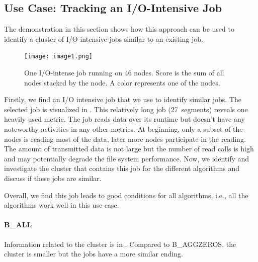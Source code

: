 \documentclass{jhps}
\makeatletter
\newcommand{\jk}[1]{\todo[inline]{JK:\@#1}}
\newcommand{\eb}[1]{\todo[inline, color=GreenYellow]{EB:\@#1}}
\makeatother
\begin{document}
\FloatBarrier
\subsection{Use Case: Tracking an I/O-Intensive Job}
The demonstration in this section shows how this approach can be used to identify a cluster of I/O-intensive jobs similar to an existing job.

\begin{figure}
  \centering
  \texttt{[image: image1.png]}
  \caption{One I/O-intense job running on 46 nodes.
Score is the sum of all nodes stacked by the node.
A color represents one of the nodes.}
  \label{fig:use_case}
\end{figure}

Firstly, we find an I/O intensive job that we use to identify similar jobs.
The selected job is visualized in .
This relatively long job (27~segments) reveals one heavily used metric.
The job reads data over its runtime but doesn't have any noteworthy activities in any other metrics.
At beginning, only a subset of the nodes is reading most of the data, later more nodes participate in the reading.
The amount of transmitted data is not large but the number of read calls is high and may potentially degrade the file system performance.
Now, we identify and investigate the cluster that contains this job for the different algorithms and discuss if these jobs are similar.

Overall, we find this job leads to good conditions for all algorithms, i.e., all the algorithms work well in this use case.

\FloatBarrier
\paragraph{B\_ALL}
Information related to the cluster is in .
Compared to B\_AGGZEROS, the cluster is smaller but the jobs have a more similar ending.

\end{document}
